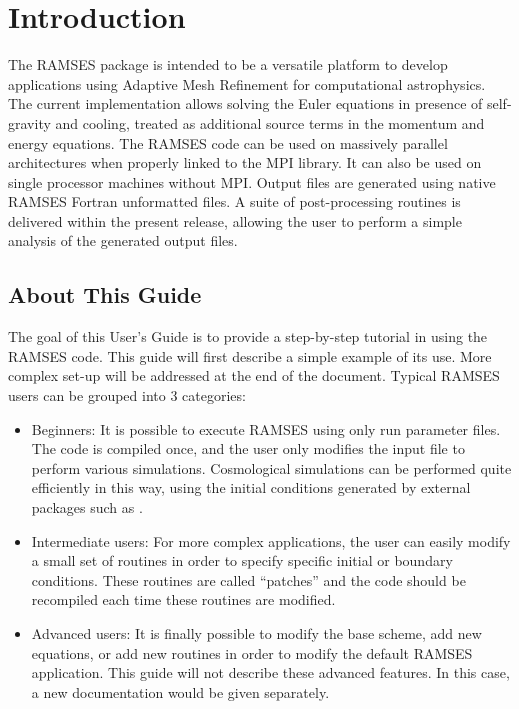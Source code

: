 \clearpage
\section{Introduction}

The RAMSES package is intended to be a versatile platform to develop
applications using Adaptive Mesh Refinement for computational
astrophysics. The current implementation allows solving the Euler
equations in presence of self-gravity and cooling, treated as additional
source terms in the momentum and energy equations. The RAMSES code can
be used on massively parallel architectures when properly linked to the
MPI library. It can also be used on single processor machines without
MPI. Output files are generated using native RAMSES Fortran unformatted
files. A suite of post-processing routines is delivered within the
present release, allowing the user to perform a simple analysis of the
generated output files.

\subsection{About This Guide}

The goal of this User's Guide is to provide a step-by-step tutorial in
using the RAMSES code. This guide will first describe a simple example of
its use. More complex set-up will be addressed at the end of the
document. Typical RAMSES users can be grouped into 3 categories:

\begin{itemize}
   \item Beginners: It is possible to execute RAMSES using only run
parameter files. The code is compiled once, and the user only modifies
the input file to perform various simulations. Cosmological simulations
can be performed quite efficiently in this way, using the initial
conditions generated by external packages such as .
   \item Intermediate users: For more complex applications, the user can
easily modify a small set of routines in order to specify specific
initial or boundary conditions. These routines are called ``patches''
and the code should be recompiled each time these routines are
modified.
   \item Advanced users: It is finally possible to modify the base
scheme, add new equations, or add new routines in order to modify the
default RAMSES application. This guide will not describe these advanced
features. In this case, a new documentation would be given separately.
\end{itemize}

